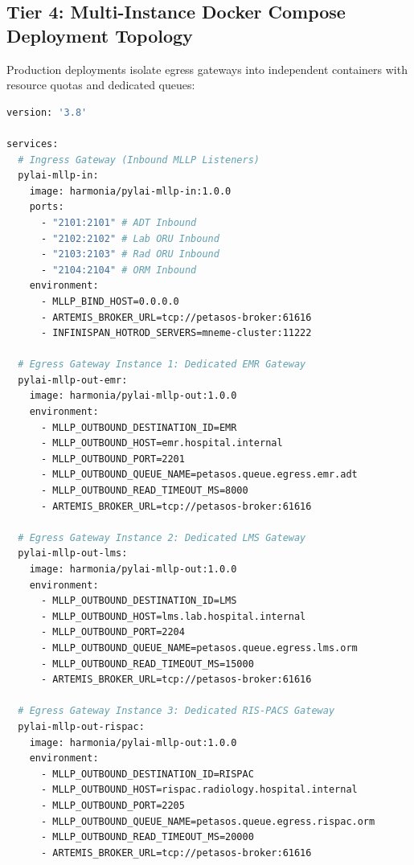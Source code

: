 \subsection{Tier 4: Multi-Instance Docker Compose Deployment Topology}

Production deployments isolate egress gateways into independent containers with resource quotas and dedicated queues:

\begin{lstlisting}[language=bash, caption={Docker Compose Multi-Instance Egress Architecture}]
version: '3.8'

services:
  # Ingress Gateway (Inbound MLLP Listeners)
  pylai-mllp-in:
    image: harmonia/pylai-mllp-in:1.0.0
    ports:
      - "2101:2101" # ADT Inbound
      - "2102:2102" # Lab ORU Inbound
      - "2103:2103" # Rad ORU Inbound
      - "2104:2104" # ORM Inbound
    environment:
      - MLLP_BIND_HOST=0.0.0.0
      - ARTEMIS_BROKER_URL=tcp://petasos-broker:61616
      - INFINISPAN_HOTROD_SERVERS=mneme-cluster:11222

  # Egress Gateway Instance 1: Dedicated EMR Gateway
  pylai-mllp-out-emr:
    image: harmonia/pylai-mllp-out:1.0.0
    environment:
      - MLLP_OUTBOUND_DESTINATION_ID=EMR
      - MLLP_OUTBOUND_HOST=emr.hospital.internal
      - MLLP_OUTBOUND_PORT=2201
      - MLLP_OUTBOUND_QUEUE_NAME=petasos.queue.egress.emr.adt
      - MLLP_OUTBOUND_READ_TIMEOUT_MS=8000
      - ARTEMIS_BROKER_URL=tcp://petasos-broker:61616

  # Egress Gateway Instance 2: Dedicated LMS Gateway
  pylai-mllp-out-lms:
    image: harmonia/pylai-mllp-out:1.0.0
    environment:
      - MLLP_OUTBOUND_DESTINATION_ID=LMS
      - MLLP_OUTBOUND_HOST=lms.lab.hospital.internal
      - MLLP_OUTBOUND_PORT=2204
      - MLLP_OUTBOUND_QUEUE_NAME=petasos.queue.egress.lms.orm
      - MLLP_OUTBOUND_READ_TIMEOUT_MS=15000
      - ARTEMIS_BROKER_URL=tcp://petasos-broker:61616

  # Egress Gateway Instance 3: Dedicated RIS-PACS Gateway
  pylai-mllp-out-rispac:
    image: harmonia/pylai-mllp-out:1.0.0
    environment:
      - MLLP_OUTBOUND_DESTINATION_ID=RISPAC
      - MLLP_OUTBOUND_HOST=rispac.radiology.hospital.internal
      - MLLP_OUTBOUND_PORT=2205
      - MLLP_OUTBOUND_QUEUE_NAME=petasos.queue.egress.rispac.orm
      - MLLP_OUTBOUND_READ_TIMEOUT_MS=20000
      - ARTEMIS_BROKER_URL=tcp://petasos-broker:61616
\end{lstlisting}

\newpage
